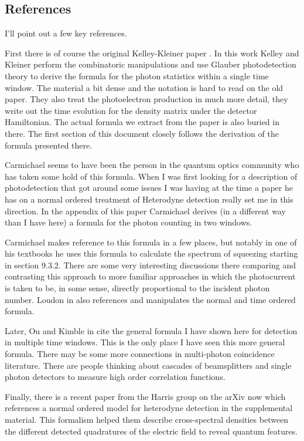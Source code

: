 \documentclass[12pt]{article}
\begin{document}
\subsection{References}

I'll point out a few key references.

First there is of course the original Kelley-Kleiner paper \cite{Kelley1964}. In this work Kelley and Kleiner perform the combinatoric manipulations and use Glauber photodetection theory \cite{Glauber1963} to derive the formula for the photon statistics within a single time window. The material a bit dense and the notation is hard to read on the old paper. They also treat the photoelectron production in much more detail, they write out the time evolution for the density matrix under the detector Hamiltonian. The actual formula we extract from the paper is also buried in there. The first section of this document closely follows the derivation of the formula presented there.

Carmichael seems to have been the person in the quantum optics community who has taken some hold of this formula. When I was first looking for a description of photodetection that got around some issues I was having at the time a paper he has on a normal ordered  treatment of Heterodyne detection \cite{Carmichael1987} really set me in this direction. In the appendix of this paper Carmichael derives (in a different way than I have here) a formula for the photon counting in two windows. 

Carmichael makes reference to this formula in a few places, but notably in one of his textbooks \cite{Carmichael2009} he uses this formula to calculate the spectrum of squeezing starting in section 9.3.2. There are some very interesting discussions there comparing and contrasting this approach to more familiar approaches in which the photocurrent is taken to be, in some sense, directly proportional to the incident photon number. Loudon in \cite{Loudon2000} also references and manipulates the normal and time ordered formula.

Later, Ou and Kimble in \cite{Ou1995} cite the general formula I have shown here for detection in multiple time windows. This is the only place I have seen this more general formula. There may be some more connections in multi-photon coincidence literature. There are people thinking about cascades of beamsplitters and single photon detectors to measure high order correlation functions.

Finally, there is a recent paper from the Harris group \cite{Shkarin2017} on the arXiv now which references a normal ordered model for heterodyne detection in the supplemental material. This formalism helped them describe cross-spectral densities between the different detected quadratures of the electric field to reveal quantum features.
\end{document}
